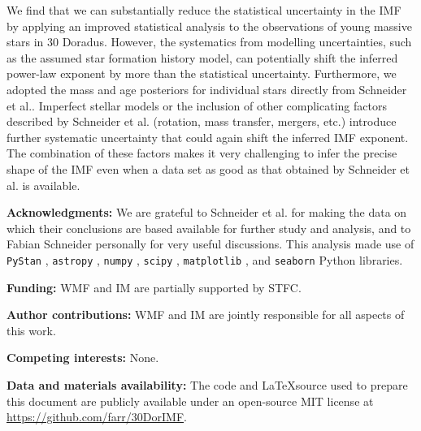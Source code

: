 \documentclass[12pt]{article}
\begin{document}
We find that we can substantially reduce the statistical uncertainty in the IMF by applying an improved statistical analysis to the observations of young massive stars in 30 Doradus.  However, the systematics from modelling uncertainties, such as the assumed star formation history model, can potentially shift the inferred power-law exponent by more than the statistical uncertainty.   Furthermore, we adopted the mass and age posteriors for individual stars directly from Schneider et al.\cite{Schneider:2018}.  Imperfect stellar models or the inclusion of other complicating factors described by Schneider et al.\cite{Schneider:2018} (rotation, mass transfer, mergers, etc.) introduce further systematic uncertainty that could again shift the inferred IMF exponent.  The combination of these factors makes it very challenging to infer the precise shape of the IMF even when a data set as good as that obtained by Schneider et al.\cite{Schneider:2018} is available.



{\bf Acknowledgments:} We are grateful to Schneider et al.\cite{Schneider:2018} for making the data on which their conclusions are based available for further study and analysis, and to Fabian Schneider personally for very useful discussions.  This analysis made use of \texttt{PyStan} \cite{STAN}, \texttt{astropy} \cite{astropy}, \texttt{numpy} \cite{numpy}, \texttt{scipy} \cite{scipy}, \texttt{matplotlib} \cite{matplotlib}, and \texttt{seaborn} \cite{seaborn} Python libraries.

{\bf Funding:} WMF and IM are partially supported by STFC.

{\bf Author contributions:} WMF and IM are jointly responsible for all aspects of this work.

{\bf Competing interests:} None.

{\bf Data and materials availability:} The code and \LaTeX source used to prepare this document are publicly available under an open-source MIT license at \url{https://github.com/farr/30DorIMF}.



\end{document}
